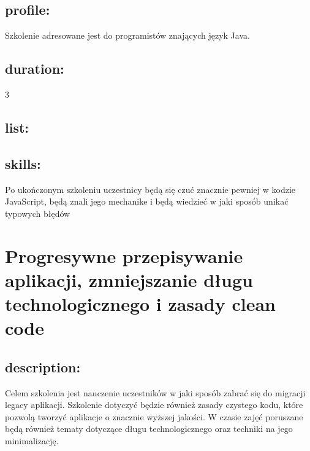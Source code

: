 \documentclass{article}[10pt]
\begin{document}
	\subsection*{profile:}
\begin{adjustwidth}{2cm}{}
	
Szkolenie adresowane jest do programistów znających język Java.
\end{adjustwidth}
	\subsection*{duration:}
\begin{adjustwidth}{2cm}{}
	3
\end{adjustwidth}

	\subsection*{list:}
\begin{adjustwidth}{1.5cm}{}
	\begin{itemize}








	\end{itemize}
\end{adjustwidth}

	\subsection*{skills:}
\begin{adjustwidth}{2cm}{}
	
Po ukończonym szkoleniu uczestnicy będą się czuć znacznie pewniej w kodzie JavaScript, będą znali jego mechanike i będą wiedzieć w jaki sposób unikać typowych błędów

\end{adjustwidth}

\newpage


    
	\section{Progresywne przepisywanie aplikacji, zmniejszanie długu technologicznego i zasady clean code}

	\subsection*{description:}
	\begin{adjustwidth}{2cm}{}
		Celem szkolenia jest nauczenie uczestników w jaki sposób zabrać się do migracji legacy aplikacji.
     Szkolenie dotyczyć będzie również zasady czystego kodu, które pozwolą tworzyć aplikacje o znacznie wyższej jakości. 
     W czasie zajęć poruszane będą również tematy dotyczące długu technologicznego oraz techniki na jego minimalizację.

	\end{adjustwidth}
\end{document}
